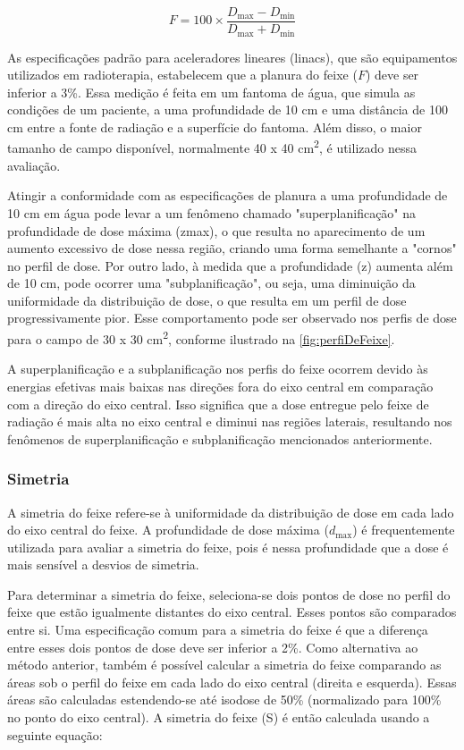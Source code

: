 \documentclass[11pt,a4paper]{article}
\begin{document}
    \begin{equation}
        F = 100 \times \frac{D_{\text{max}} - D_{\text{min}}}{D_{\text{max}} + D_{\text{min}}}
    \end{equation}

    As especificações padrão para aceleradores lineares (linacs), que são equipamentos utilizados em radioterapia, estabelecem que a planura do feixe ($F$) deve ser inferior a 3\%. Essa medição é feita em um fantoma de água, que simula as condições de um paciente, a uma profundidade de 10 cm e uma distância de 100 cm entre a fonte de radiação e a superfície do fantoma. Além disso, o maior tamanho de campo disponível, normalmente 40 x 40 \unit{cm^2}, é utilizado nessa avaliação.

    Atingir a conformidade com as especificações de planura a uma profundidade de 10 cm em água pode levar a um fenômeno chamado "superplanificação" na profundidade de dose máxima (zmax), o que resulta no aparecimento de um aumento excessivo de dose nessa região, criando uma forma semelhante a "cornos" no perfil de dose. Por outro lado, à medida que a profundidade (z) aumenta além de 10 cm, pode ocorrer uma "subplanificação", ou seja, uma diminuição da uniformidade da distribuição de dose, o que resulta em um perfil de dose progressivamente pior. Esse comportamento pode ser observado nos perfis de dose para o campo de 30 x 30 \unit{cm^2}, conforme ilustrado na \ref{fig:perfiDeFeixe}.

    A superplanificação e a subplanificação nos perfis do feixe ocorrem devido às energias efetivas mais baixas nas direções fora do eixo central em comparação com a direção do eixo central. Isso significa que a dose entregue pelo feixe de radiação é mais alta no eixo central e diminui nas regiões laterais, resultando nos fenômenos de superplanificação e subplanificação mencionados anteriormente.

\subsubsection*{Simetria}

    A simetria do feixe refere-se à uniformidade da distribuição de dose em cada lado do eixo central do feixe. A profundidade de dose máxima ($d_{\text{max}}$) é frequentemente utilizada para avaliar a simetria do feixe, pois é nessa profundidade que a dose é mais sensível a desvios de simetria.

    Para determinar a simetria do feixe, seleciona-se dois pontos de dose no perfil do feixe que estão igualmente distantes do eixo central. Esses pontos são comparados entre si. Uma especificação comum para a simetria do feixe é que a diferença entre esses dois pontos de dose deve ser inferior a 2\%.  Como alternativa ao método anterior, também é possível calcular a simetria do feixe comparando as áreas sob o perfil do feixe em cada lado do eixo central (direita e esquerda). Essas áreas são calculadas estendendo-se até isodose de 50\% (normalizado para 100\% no ponto do eixo central). A simetria do feixe (S) é então calculada usando a seguinte equação:
\end{document}
